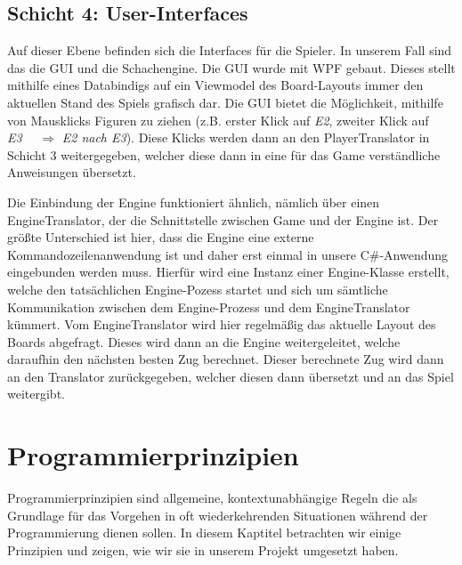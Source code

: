 \documentclass[
10pt, %
a4paper, %
oneside, %
headinclude,footinclude, %
BCOR5mm, %
]{scrartcl}
\begin{document}
\subsection{Schicht 4: User-Interfaces}
Auf dieser Ebene befinden sich die Interfaces für die Spieler. In unserem Fall sind das die GUI und die Schachengine. Die GUI wurde mit WPF gebaut. Dieses stellt mithilfe eines Databindigs auf ein Viewmodel des Board-Layouts immer den aktuellen Stand des Spiels grafisch dar. 
Die GUI bietet die Möglichkeit, mithilfe von Mausklicks Figuren zu ziehen (z.B. erster Klick auf \textit{E2}, zweiter Klick auf \textit{E3}~~ $\Rightarrow$ \textit{E2 nach E3}). Diese Klicks werden dann an den PlayerTranslator in Schicht 3 weitergegeben, welcher diese dann in eine für das Game verständliche Anweisungen übersetzt.

Die Einbindung der Engine funktioniert ähnlich, nämlich über einen EngineTranslator, der die Schnittstelle zwischen Game und der Engine ist. Der größte Unterschied ist hier, dass die Engine eine externe Kommandozeilenanwendung ist und daher erst einmal in unsere C\#-Anwendung eingebunden werden muss.
Hierfür wird eine Instanz einer Engine-Klasse erstellt, welche den tatsächlichen Engine-Pozess startet und sich um sämtliche Kommunikation zwischen dem Engine-Prozess und dem EngineTranslator kümmert. Vom EngineTranslator wird hier regelmäßig das aktuelle Layout des Boards abgefragt. Dieses wird dann an die Engine weitergeleitet, welche daraufhin den nächsten besten Zug berechnet. Dieser berechnete Zug wird dann an den Translator zurückgegeben, welcher diesen dann übersetzt und an das Spiel weitergibt.
\section{Programmierprinzipien}
Programmierprinzipien sind allgemeine, kontextunabhängige Regeln die als Grundlage für das Vorgehen in oft wiederkehrenden Situationen während der Programmierung dienen sollen.
In diesem Kaptitel betrachten wir einige Prinzipien und zeigen, wie wir sie in unserem Projekt umgesetzt haben.
\end{document}
